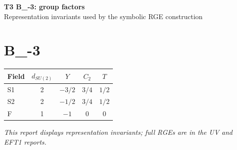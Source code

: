 \documentclass[10pt,a4paper]{article}
\begin{document}
\begin{center}
{\Large\bfseries T3 B\_-3: group factors}\\[4pt]
Representation invariants used by the symbolic RGE construction
\end{center}
\bigskip
\section*{B\_-3}
\begin{longtable}{@{}lcccc@{}}
\toprule Field & $d_{SU(2)}$ & $Y$ & $C_2$ & $T$ \\
\midrule
S1 & 2 & $-3/2$ & $3/4$ & $1/2$ \\
S2 & 2 & $-1/2$ & $3/4$ & $1/2$ \\
F & 1 & $-1$ & $0$ & $0$ \\
\bottomrule
\end{longtable}
\emph{This report displays representation invariants; full RGEs are in the UV and EFT1 reports.}
\end{document}
